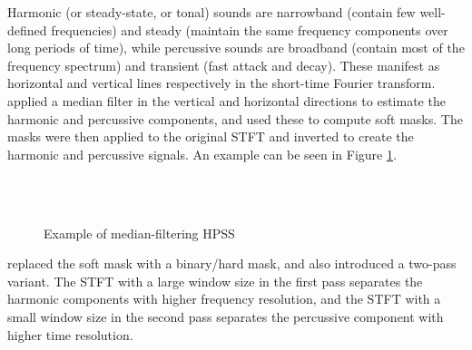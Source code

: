 \documentclass[10pt,letter]{article}
\begin{document}
Harmonic (or steady-state, or tonal) sounds are narrowband (contain few well-defined frequencies) and steady (maintain the same frequency components over long periods of time), while percussive sounds  are broadband (contain most of the frequency spectrum) and transient (fast attack and decay). These manifest as horizontal and vertical lines respectively in the short-time Fourier transform. \citet{fitzgerald1} applied a median filter in the vertical and horizontal directions to estimate the harmonic and percussive components, and used these to compute soft masks. The masks were then applied to the original STFT and inverted to create the harmonic and percussive signals. An example can be seen in Figure \ref{fig:fitz1}.

\begin{figure}[ht]
	\centering
	\\
	\\
	\caption{Example of median-filtering HPSS}
	\label{fig:fitz1}
\end{figure}

\citet{driedger} replaced the soft mask with a binary/hard mask, and also introduced a two-pass variant. The STFT with a large window size in the first pass separates the harmonic components with higher frequency resolution, and the STFT with a small window size in the second pass separates the percussive component with higher time resolution.
\end{document}
